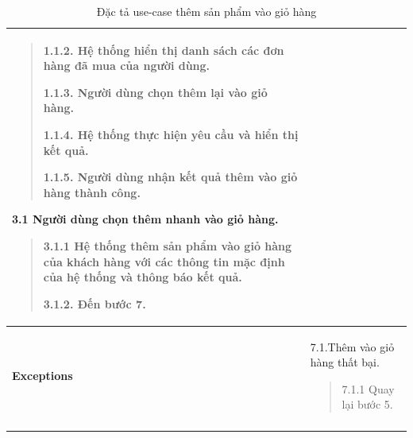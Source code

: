 {\begin{longtable}{| p{} | p{} |}
\begin{quote}
            1.1.2. Hệ thống hiển thị danh sách các đơn hàng đã mua của người dùng.

            1.1.3. Người dùng chọn thêm lại vào giỏ hàng.

            1.1.4. Hệ thống thực hiện yêu cầu và hiển thị kết quả.

            1.1.5. Người dùng nhận kết quả thêm vào giỏ hàng thành công.

        \end{quote}
        3.1 Người dùng chọn thêm nhanh vào giỏ hàng.
        \begin{quote}
            3.1.1 Hệ thống thêm sản phẩm vào giỏ hàng của khách hàng với các thông tin mặc định của hệ thống và thông báo kết quả.

            3.1.2. Đến bước 7.
        \end{quote}
        \\
        \hline
        \begin{flushleft}
            \textbf{Exceptions}
        \end{flushleft}
         &
        7.1.Thêm vào giỏ hàng thất bại.
        \begin{quote}
            7.1.1 Quay lại bước 5.
        \end{quote}
        \\
        \hline
        \caption{Đặc tả use-case thêm sản phẩm vào giỏ hàng}
    \end{longtable}
}


